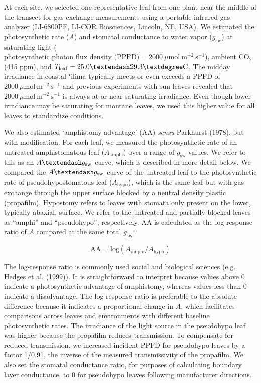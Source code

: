 \documentclass[
  letterpaper,
  DIV=11,
  numbers=noendperiod]{scrartcl}
\begin{document}
At each site, we selected one representative leaf from one plant near
the middle of the transect for gas exchange measurements using a
portable infrared gas analyzer (LI-6800PF, LI-COR Biosciences, Lincoln,
NE, USA). We estimated the photosynthetic rate (\(A\)) and stomatal
conductance to water vapor (\(g_\text{sw}\)) at saturating light
(\(\text{photosynthetic photon flux density (PPFD)} = 2000~\mu \text{mol}~\text{m}^{-2}~\text{s}^{-1}\)),
ambient CO\(_2\) (415 ppm), and
\(T_\mathrm{leaf} = 25.0 \textendash 29.3° \text{C}\). The midday
irradiance in coastal ʻilima typically meets or even exceeds a PPFD of
\(2000~\mu \text{mol}~\text{m}^{-2}~\text{s}^{-1}\) and previous
experiments with sun leaves revealed that
\(2000~\mu \text{mol}~\text{m}^{-2}~\text{s}^{-1}\) is always at or near
saturating irradiance. Even though lower irradiance may be saturating
for montane leaves, we used this higher value for all leaves to
standardize conditions.

We also estimated `amphistomy advantage' (\(\mathrm{AA}\)) \emph{sensu}
Parkhurst (1978), but with modification. For each leaf, we measured the
photosynthetic rate of an untreated amphistomatous leaf
(\(A_{\mathrm{amphi}}\)) over a range of \(g_\text{sw}\) values. We
refer to this as an \(A \textendash g_\text{sw}\) curve, which is
described in more detail below. We compared the
\(A \textendash g_\text{sw}\) curve of the untreated leaf to the
photosynthetic rate of pseudohypostomatous leaf (\(A_\mathrm{hypo}\)),
which is the same leaf but with gas exchange through the upper surface
blocked by a neutral density plastic (propafilm). Hypostomy refers to
leaves with stomata only present on the lower, typically abaxial,
surface. We refer to the untreated and partially blocked leaves as
``amphi'' and ``pseudohypo'', respectively. \(\mathrm{AA}\) is
calculated as the log-response ratio of \(A\) compared at the same total
\(g_\text{sw}\):

\[\mathrm{AA} = \mathrm{log}(A_{\mathrm{amphi}} / A_{\mathrm{hypo}})\]

The log-response ratio is commonly used social and biological sciences
(e.g. Hedges et al. (1999)). It is straightforward to interpret because
values above 0 indicate a photosynthetic advantage of amphistomy,
whereas values less than 0 indicate a disadvantage. The log-response
ratio is preferable to the absolute difference because it indicates a
proportional change in \(A\), which facilitates comparisons across
leaves and environments with different baseline photosynthetic rates.
The irradiance of the light source in the pseudohypo leaf was higher
because the propafilm reduces transmission. To compensate for reduced
transmission, we increased incident \(\mathrm{PPFD}\) for pseudohypo
leaves by a factor 1/0.91, the inverse of the measured transmissivity of
the propafilm. We also set the stomatal conductance ratio, for purposes
of calculating boundary layer conductance, to 0 for pseudohypo leaves
following manufacturer directions.
\end{document}
